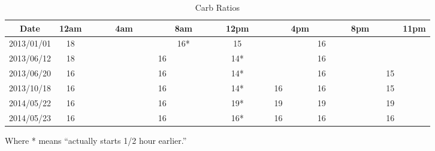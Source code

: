 \begin{table}[h]
\caption{Carb Ratios}
\footnotesize
\begin{center}
\begin{tabular}{|c|c|c|c|c|c|c|c|c|c|c|c|c|c|c|c|c|c|c|c|c|c|c|c|c|}
\hline
Date       & 12am & & & & 4am & & &    & 8am & & & & 12pm & & &    & 4pm &    & & & 8pm & &    & 11pm \\ \hline
2013/01/01 & 18   & & & &     & & &    & 16* & & & & 15   & & &    &     & 16 & & &     & &    &      \\
2013/06/12 & 18   & & & &     & & & 16 &     & & & & 14*  & & &    &     & 16 & & &     & &    &      \\
2013/06/20 & 16   & & & &     & & & 16 &     & & & & 14*  & & &    &     & 16 & & &     & & 15 &      \\
2013/10/18 & 16   & & & &     & & & 16 &     & & & & 14*  & & & 16 &     & 16 & & &     & & 15 &      \\
2014/05/22 & 16   & & & &     & & & 16 &     & & & & 19*  & & & 19 &     & 19 & & &     & & 19 &      \\
2014/05/23 & 16   & & & &     & & & 16 &     & & & & 16*  & & & 16 &     & 16 & & &     & & 16 &      \\
\hline
\end{tabular}
\end{center}
\label{default}
\end{table}%
Where * means ``actually starts 1/2 hour earlier.''

